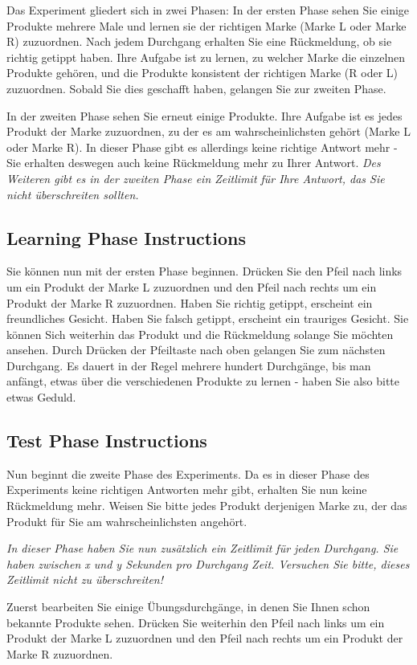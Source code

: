 \documentclass[a4paper,man,natbib]{apa6}
\begin{document}
Das Experiment gliedert sich in zwei Phasen:
In der ersten Phase sehen Sie einige Produkte mehrere Male und lernen sie der richtigen Marke (Marke L oder Marke R) zuzuordnen. Nach jedem Durchgang erhalten Sie eine Rückmeldung, ob sie richtig getippt haben. Ihre Aufgabe ist zu lernen, zu welcher Marke die einzelnen Produkte gehören, und die Produkte konsistent der richtigen Marke (R oder L) zuzuordnen. Sobald Sie dies geschafft haben, gelangen Sie zur zweiten Phase.

In der zweiten Phase sehen Sie erneut einige Produkte. Ihre Aufgabe ist es jedes Produkt der Marke zuzuordnen, zu der es am wahrscheinlichsten gehört (Marke L oder Marke R). In dieser Phase gibt es allerdings keine richtige Antwort mehr - Sie erhalten deswegen auch keine Rückmeldung mehr zu Ihrer Antwort. \textit{Des Weiteren gibt es in der zweiten Phase ein Zeitlimit für Ihre Antwort, das Sie nicht überschreiten sollten.}

\subsection{Learning Phase Instructions}
Sie können nun mit der ersten Phase beginnen.
Drücken Sie den Pfeil nach links um ein Produkt der Marke L zuzuordnen und den Pfeil nach rechts um ein Produkt der Marke R zuzuordnen.
Haben Sie richtig getippt, erscheint ein freundliches Gesicht. Haben Sie falsch getippt, erscheint ein trauriges Gesicht.
Sie können Sich weiterhin das Produkt und die Rückmeldung solange Sie möchten ansehen.  Durch Drücken der Pfeiltaste nach oben gelangen Sie zum nächsten Durchgang.
Es dauert in der Regel mehrere hundert Durchgänge, bis man anfängt, etwas über die verschiedenen Produkte zu lernen - haben Sie also bitte etwas Geduld.

\subsection{Test Phase Instructions}
Nun beginnt die zweite Phase des Experiments.
Da es in dieser Phase des Experiments keine richtigen Antworten mehr gibt, erhalten Sie nun keine Rückmeldung mehr. Weisen Sie bitte jedes Produkt derjenigen Marke zu, der das Produkt für Sie am wahrscheinlichsten angehört.

\textit{In dieser Phase haben Sie nun zusätzlich ein Zeitlimit für jeden Durchgang.
Sie haben zwischen x und y Sekunden pro Durchgang Zeit.
Versuchen Sie bitte, dieses Zeitlimit nicht zu überschreiten!}

Zuerst bearbeiten Sie einige Übungsdurchgänge, in denen Sie Ihnen schon bekannte Produkte sehen.
Drücken Sie weiterhin den Pfeil nach links um ein Produkt der Marke L zuzuordnen und den Pfeil nach rechts um ein Produkt der Marke R zuzuordnen.
\end{document}
